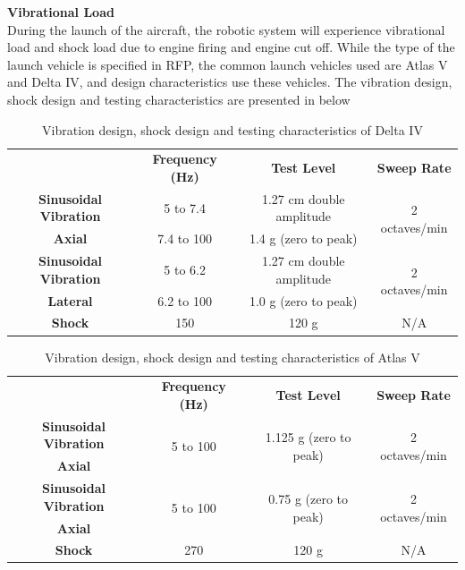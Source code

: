 \textbf{Vibrational Load}\\
During the launch of the aircraft, the robotic system will experience vibrational load and shock load due to engine firing and engine cut off. While the type of the launch vehicle is specified in \gls{RFP}, the common launch vehicles used are Atlas V and Delta IV, and design characteristics use these vehicles. The vibration design, shock design and testing characteristics are presented in  below

\begin{table}[H]
\centering
\caption[Vibration design, shock design and testing characteristics of Delta IV]{Vibration design, shock design and testing characteristics of Delta IV \cite{delta_launch}}
\begin{tabular}{|c|c|c|c|}
\hline
	&	\textbf{Frequency (\gls{Hz})}	&	\textbf{Test Level}	&	\textbf{Sweep Rate}	\\\hhline{|=|=|=|=|}
{\textbf{Sinusoidal Vibration}}	&	5 to 7.4	&	1.27 \gls{cm} double amplitude	&	\multirow{2}{*}{2 octaves/min}	\\\cline{2-3}
{\textbf{Axial}}	&	7.4 to 100	&	1.4 \gls{g} (zero to peak)	&	\\\hline
{\textbf{Sinusoidal Vibration}}	&	5 to 6.2	&	1.27 \gls{cm} double amplitude	&	\multirow{2}{*}{2 octaves/min}	\\\cline{2-3}
{\textbf{Lateral}}	&	6.2 to 100	&	1.0 \gls{g} (zero to peak)	&	\\\hline
\textbf{Shock}	&	150	&	120 \gls{g}	&	N/A	\\\hline

\end{tabular}
\label{delta_launch}
\end{table}

\begin{table}[H]
\centering
\caption[Vibration design, shock design and testing characteristics of Atlas V]{Vibration design, shock design and testing characteristics of Atlas V \cite{atlas_launch}}
\begin{tabular}{|c|c|c|c|}
\hline
	&	\textbf{Frequency (Hz)}	&	\textbf{Test Level}	&	\textbf{Sweep Rate}	\\\hhline{|=|=|=|=|}
{\textbf{Sinusoidal Vibration}}	&	\multirow{2}{*}{5 to 100}	&	\multirow{2}{*}{1.125 \gls{g} (zero to peak)}	&	\multirow{2}{*}{2 octaves/min}	\\
{\textbf{Axial}}	&		&		&	\\\hline
{\textbf{Sinusoidal Vibration}}	&	\multirow{2}{*}{5 to 100}	&	\multirow{2}{*}{0.75 \gls{g} (zero to peak)}	&	\multirow{2}{*}{2 octaves/min}	\\
{\textbf{Axial}}	&		&		&	\\\hline
\textbf{Shock}	&	270	&	120 \gls{g}	&	N/A	\\\hline
\end{tabular}
\label{atlas_launch}
\end{table}



